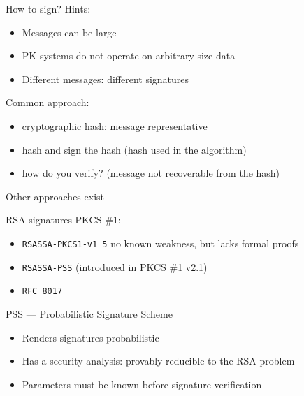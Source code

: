 \begin{frame}{How to sign?}
  Hints:
  \begin{itemize}[<+(1)->]
    \item Messages can be large
    \item PK systems do not operate on arbitrary size data
    \item Different messages: different signatures
  \end{itemize}

  \pause
  Common approach:
  \begin{itemize}[<+(1)->]
    \item cryptographic hash: message representative
    \item hash and sign the hash (hash used in the algorithm)
    \item how do you verify? (message not recoverable from the hash)
  \end{itemize}

  \pause
  Other approaches exist
\end{frame}

\begin{frame}{RSA signatures}
  \pause
  PKCS \#1:
  \begin{itemize}[<+(1)->]
    \item \texttt{RSASSA-PKCS1-v1\_5} no known weakness, but lacks formal proofs
    \item \texttt{RSASSA-PSS} (introduced in PKCS \#1 v2.1)
    \item \href{https://datatracker.ietf.org/doc/html/rfc8017}{\texttt{RFC 8017}}
  \end{itemize}

  \vfill

  \pause
  PSS --- Probabilistic Signature Scheme
  \begin{itemize}[<+(1)->]
    \item Renders signatures probabilistic
    \item Has a security analysis: provably reducible to the RSA problem
    \item Parameters must be known before signature verification 
  \end{itemize}
\end{frame}

